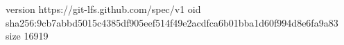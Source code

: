 version https://git-lfs.github.com/spec/v1
oid sha256:9cb7abbd5015c4385df905eef514f49e2acdfca6b01bba1d60f994d8e6fa9a83
size 16919
